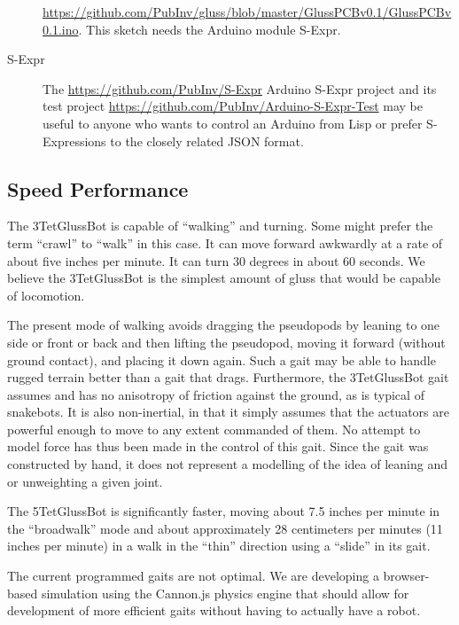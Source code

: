 \documentclass[11pt]{article}
\begin{document}
\begin{description}
\href{https://github.com/PubInv/gluss/blob/master/GlussPCBv0.1/GlussPCBv0.1.ino}
     {https://github.com/PubInv/gluss/blob/master/GlussPCBv0.1/GlussPCBv0.1.ino}.
     This sketch needs the Arduino module S-Expr.
     
\item [S-Expr]
  The \href{https://github.com/PubInv/S-Expr}{https://github.com/PubInv/S-Expr} Arduino S-Expr project and its
  test project
  \href{https://github.com/PubInv/Arduino-S-Expr-Test}{https://github.com/PubInv/Arduino-S-Expr-Test} 
  may be useful to anyone who wants to control an Arduino from Lisp or prefer S-Expressions to the closely related JSON format.

  
\end{description}

\subsection{Speed Performance}

The 3TetGlussBot is capable of ``walking'' and turning. Some might prefer the term ``crawl'' to ``walk'' in
this case. It can move forward awkwardly at a rate
of about five inches per minute. It can turn 30 degrees in about 60 seconds.
We believe the 3TetGlussBot is the simplest amount of gluss that would be capable of locomotion.

The present mode of walking avoids dragging the pseudopods by leaning to one side or front or back and
then lifting the pseudopod, moving it forward (without ground contact), and placing it down again.
Such a gait may be able to handle rugged terrain better than a gait that drags. Furthermore, the
3TetGlussBot gait assumes and has no anisotropy of friction against the ground, as is typical
of snakebots.
It is also non-inertial, in that it simply assumes that the actuators are powerful enough to
move to any extent commanded of them. No attempt to model force has thus been made in the control of this gait.
Since the gait was constructed by hand, it does not represent a modelling of the idea of leaning and or
unweighting a given joint.

The 5TetGlussBot is significantly faster, moving about 7.5 inches per minute in the ``broadwalk'' mode
and about approximately 28 centimeters per minutes (11 inches per minute) in a walk in the ``thin'' direction using a ``slide'' in its gait.

The current programmed gaits are not optimal.
We are developing a browser-based simulation using the Cannon.js physics engine that should allow for development
of more efficient gaits without having to actually have a robot.
\end{document}
